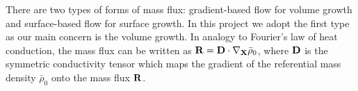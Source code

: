 There are two types of forms of mass flux: gradient-based flow for volume growth and surface-based flow for surface growth. In this project we adopt the first type as our main concern is the volume growth. In analogy to Fourier's law of heat conduction, the mass flux can be written as $\bold{R} = \bold{D} \cdot \nabla_{\bold{X}} {\bar\rho}_0$, where $\bold{D}$ is the symmetric conductivity tensor which maps the gradient of the referential mass density ${\bar{\rho}}_0$ onto the mass flux $\bold{R}$.








